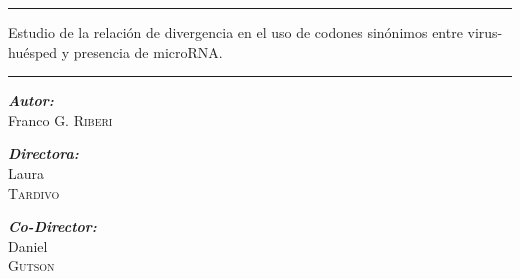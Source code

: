 \documentclass[12pt,a4paper]{report}
\newcommand{\HRule}{\rule{\linewidth}{0.5mm}}
\begin{document}
\noindent \HRule 
\begin{center} \large Estudio de la relación de divergencia en el uso de codones sinónimos entre virus-huésped y presencia de microRNA. \end{center} 

\HRule 
\vskip 2.5cm

\begin{center} 
\large \textbf{\emph{Autor:}}\\
\large Franco G. \textsc{Riberi}
\end{center}
\vskip 1.5cm

\begin{minipage}{0.35\textwidth}
\begin{center} 
\hspace*{1cm} \textbf{\emph{Directora:}}\\
\hspace*{1cm} Laura \\ \hspace*{1cm} \textsc{Tardivo}
\end{center} 
\end{minipage}
\begin{minipage}{0.55\textwidth}
\begin{center} 
\textbf{\emph{Co-Director:}} \\
Daniel \\ \textsc{Gutson}
\end{center}
\end{minipage}


\newpage
\thispagestyle{empty}


\newpage
\thispagestyle{empty}


\tableofcontents

\newpage
\listoffigures

\fancyhead{} 
\fancyhead[L]{\bfseries\rightmark}
\fancyfoot{} 
\fancyfoot[LE,RO]{\bfseries \thepage}
\renewcommand{\headrulewidth}{0.4pt}
\renewcommand{\footrulewidth}{0.4pt}
\pagestyle{fancy} 
\end{document}
